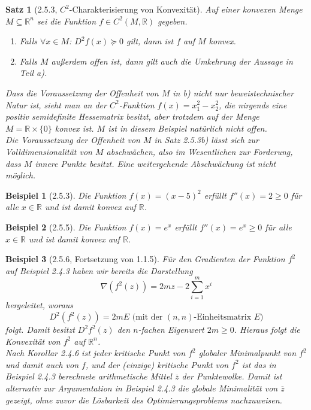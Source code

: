 \documentclass[12pt]{extreport} %
\newcommand{\R}{\mathbb{R}}
\theoremstyle{named}
\theoremstyle{nnamed}
\theoremstyle{itshape}
\newtheorem*{satz}{Satz}
\theoremstyle{normal}
\newtheorem*{beispiel}{Beispiel}
\begin{document}
\begin{satz}[2.5.3, $C^2$-Charakterisierung von Konvexität]
	Auf einer konvexen Menge $M \subseteq \R^n$ sei die Funktion $f \in C^2(M, \R)$	gegeben. 
	\begin{enumerate}
		\item Falls $\forall x \in M$: $D^2 f(x) \succeq 0$ gilt, dann ist $f$ auf $M$ konvex.
		\item Falls $M$ außerdem offen ist, dann gilt auch die Umkehrung der Aussage in Teil a).
	\end{enumerate}
	Dass die Voraussetzung der Offenheit von $M$ in b) nicht nur beweistechnischer Natur ist, sieht man an der $C^2$-Funktion $f(x) = x_1^2 - x_2^2$, die nirgends eine positiv semidefinite Hessematrix besitzt, aber trotzdem auf der Menge $M = \R \times \{ 0 \}$ konvex ist. $M$ ist in diesem Beispiel natürlich nicht offen. ~\\
	
	Die Voraussetzung der Offenheit von $M$ in Satz 2.5.3b) lässt sich zur Volldimensionalität von $M$ abschwächen, also im Wesentlichen zur Forderung, dass $M$ innere Punkte besitzt. Eine weitergehende Abschwächung ist nicht möglich.
\end{satz}

\begin{beispiel}[2.5.3]
	Die Funktion $f(x) = (x - 5)^2$ erfüllt $f''(x) = 2 \geq 0$ für alle $x \in \R$ und ist damit konvex auf $\R$.	
\end{beispiel}

\begin{beispiel}[2.5.5]
	Die Funktion $f(x) = e^x$ erfüllt $f''(x) = e^x \geq 0$ für alle $x \in \R$ und ist damit konvex auf $\R$.	
\end{beispiel}

\begin{beispiel}[2.5.6, Fortsetzung von 1.1.5]
	Für den Gradienten der Funktion $f^2$ auf Beispiel 2.4.3 haben wir bereits die Darstellung 
	$$ \nabla \left( f^2(z) \right) = 2 mz - 2 \sum_{i=1}^{m} x^i $$	
	hergeleitet, woraus
	$$ D^2 \left( f^2(z) \right) = 2mE \text{ (mit der $(n,n)$-Einheitsmatrix $E$)} $$
	folgt. Damit besitzt $D^2 f^2(z)$ den $n$-fachen Eigenwert $2m \geq 0$. Hieraus folgt die Konvexität von $f^2$ auf $\R^n$. ~\\
	
	Nach Korollar 2.4.6 ist jeder kritische Punkt von $f^2$ globaler Minimalpunkt von $f^2$ und damit auch von $f$, und der (einzige) kritische Punkt von $f^2$ ist das in Beispiel 2.4.3 berechnete arithmetische Mittel $\overline{z}$ der Punktewolke. Damit ist alternativ zur Argumentation in Beispiel 2.4.3 die globale Minimalität von $\overline{z}$ gezeigt, ohne zuvor die Lösbarkeit des Optimierungsproblems nachzuweisen.
\end{beispiel}
\end{document}
